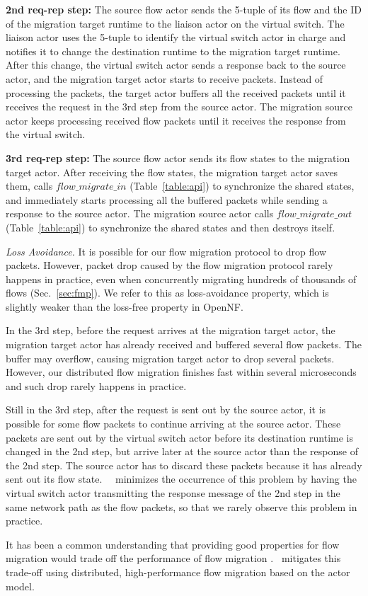 \textbf{2nd req-rep step:} The source flow actor sends the 5-tuple of its flow and the ID of the migration target runtime to the liaison actor on the virtual switch. The liaison actor uses the 5-tuple to identify the virtual switch actor in charge and notifies it to change the destination runtime to the migration target runtime. After this change, the virtual switch actor sends a response back to the source actor, and the migration target actor starts to receive packets. Instead of processing the packets, the target actor buffers all the received packets until it receives the request in the 3rd step from the source actor. The migration source actor keeps processing received flow packets until it receives the response from the virtual switch.

\textbf{3rd req-rep step:} The source flow actor sends its flow states to the migration target actor. After receiving the flow states, the migration target actor saves them, calls $flow\_migrate\_in$ (Table~\ref{table:api}) to synchronize the shared states, and immediately starts processing all the buffered packets while sending a response to the source actor. The migration source actor calls $flow\_migrate\_out$ (Table~\ref{table:api}) to synchronize the shared states and then destroys itself.


{\em Loss Avoidance.} It is possible for our flow migration protocol to drop flow packets. However, packet drop caused by the flow migration protocol rarely happens in practice, even when concurrently migrating hundreds of thousands of flows (Sec.~\ref{sec:fmp}). We refer to this as loss-avoidance property, which is slightly weaker than the loss-free property \cite{gember2015opennf} in OpenNF.

In the 3rd step, before the request arrives at the migration target actor, the migration target actor has already received and buffered several flow packets. The buffer may overflow, causing migration target actor to drop several packets. However, our distributed flow migration finishes fast within several microseconds and such drop rarely happens in practice.

Still in the 3rd step, after the request is sent out by the source actor, it is possible for some flow packets to continue arriving at the source actor. These packets are sent out by the virtual switch actor before its destination runtime is changed in the 2nd step, but arrive later at the source actor than the response of the 2nd step. The source actor has to discard these packets because it has already sent out its flow state. ~\nfactor~minimizes the occurrence of this problem by having the virtual switch actor transmitting the response message of the 2nd step in the same network path as the flow packets, so that we rarely observe this problem in practice.

It has been a common understanding that providing good properties for flow migration would trade off the performance of flow migration \cite{gember2015opennf}. \nfactor~mitigates this trade-off using distributed, high-performance flow migration based on the actor model.
